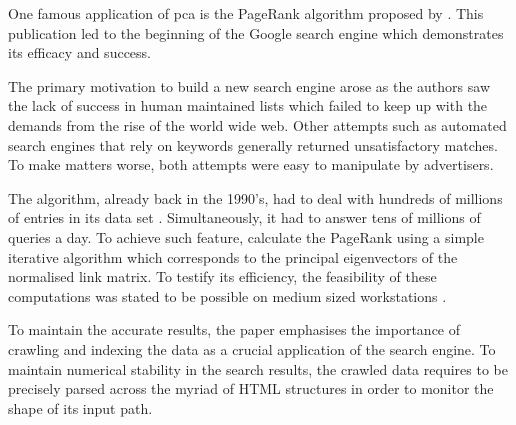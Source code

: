 One famous application of \acrlong{pca} \cite{deisenroth2020mathematics} is the PageRank algorithm proposed by .
This publication led to the beginning of the Google search engine which demonstrates its efficacy and success.

The primary motivation to build a new search engine arose as the authors saw the lack of success in human maintained lists which failed to keep up with the demands from the rise of the world wide web.
Other attempts such as automated search engines that rely on keywords generally returned unsatisfactory matches.
To make matters worse, both attempts were easy to manipulate by advertisers.
\bigskip


The algorithm, already back in the 1990's, had to deal with hundreds of millions of entries in its data set \cite{brin1998anatomy}.
Simultaneously, it had to answer tens of millions of queries a day.
To achieve such feature, \citeauthor{page1999pagerank} calculate the PageRank using a simple iterative algorithm which corresponds to the principal eigenvectors of the normalised link matrix.
To testify its efficiency, the feasibility of these computations was stated to be possible on medium sized workstations \cite{page1999pagerank}.

To maintain the accurate results, the paper emphasises the importance of crawling and indexing the data as a crucial application of the search engine.
To maintain numerical stability in the search results, the crawled data requires to be precisely parsed across the myriad of HTML structures in order to monitor the shape of its input path.
